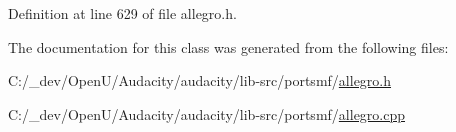 Definition at line 629 of file allegro.\+h.



The documentation for this class was generated from the following files\+:\begin{DoxyCompactItemize}
\item 
C\+:/\+\_\+dev/\+Open\+U/\+Audacity/audacity/lib-\/src/portsmf/\hyperlink{allegro_8h}{allegro.\+h}\item 
C\+:/\+\_\+dev/\+Open\+U/\+Audacity/audacity/lib-\/src/portsmf/\hyperlink{allegro_8cpp}{allegro.\+cpp}\end{DoxyCompactItemize}
